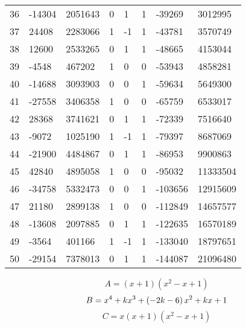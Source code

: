 \documentclass{amsart}
\begin{document}
\begin{longtable}{|l|l|l|lllll|}
36&-14304&2051643&0&1&1&-39269&3012995\\
37&24408&2283066&1&-1&1&-43781&3570749\\
38&12600&2533265&0&1&1&-48665&4153044\\
39&-4548&467202&1&0&0&-53943&4858281\\
40&-14688&3093903&0&0&1&-59634&5649300\\
41&-27558&3406358&1&0&0&-65759&6533017\\
42&28368&3741621&0&1&1&-72339&7516640\\
43&-9072&1025190&1&-1&1&-79397&8687069\\
44&-21900&4484867&0&1&1&-86953&9900863\\
45&42840&4895058&1&0&0&-95032&11333504\\
46&-34758&5332473&0&0&1&-103656&12915609\\
47&21180&2899138&1&0&0&-112849&14657577\\
48&-13608&2097885&0&1&1&-122635&16570189\\
49&-3564&401166&1&-1&1&-133040&18797651\\
50&-29154&7378013&0&1&1&-144087&21096480\\
\hline
\end{longtable}
$$A=(x
 + 1)(x^2
 - x
 + 1)$$
$$B=x^4
 + k\*x^3
 + \left(-2\*k
 - 6\right) \*x^2
 + k\*x
 + 1$$
$$C=x(x
 + 1)(x^2
 - x
 + 1)$$
\end{document}

